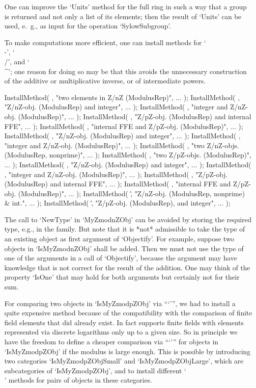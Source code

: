 One can improve the `Units' method for the full ring in such a way
that a group is returned and not only a list of its elements;
then the result of `Units' can be used, e.~g., as input for the operation
`SylowSubgroup'.

To make computations more efficient,
one can install methods for `\\-', `\\/', and `\\^';
one reason for doing so may be that this avoids the unnecessary construction
of the additive or multiplicative inverse, or of intermediate powers.

\begintt
InstallMethod( \-, "two elements in Z/nZ (ModulusRep)", ... );
InstallMethod( \-, "Z/nZ-obj. (ModulusRep) and integer", ... );
InstallMethod( \-, "integer and Z/nZ-obj. (ModulusRep)", ... );
InstallMethod( \-, "Z/pZ-obj. (ModulusRep) and internal FFE", ... );
InstallMethod( \-, "internal FFE and Z/pZ-obj. (ModulusRep)", ... );
InstallMethod( \*, "Z/nZ-obj. (ModulusRep) and integer", ... );
InstallMethod( \*, "integer and Z/nZ-obj. (ModulusRep)", ... );
InstallMethod( \/, "two Z/nZ-objs. (ModulusRep, nonprime)", ... );
InstallMethod( \/, "two Z/pZ-objs. (ModulusRep)", ... );
InstallMethod( \/, "Z/nZ-obj. (ModulusRep) and integer", ... );
InstallMethod( \/, "integer and Z/nZ-obj. (ModulusRep)", ... );
InstallMethod( \/, "Z/pZ-obj. (ModulusRep) and internal FFE", ... );
InstallMethod( \/, "internal FFE and Z/pZ-obj. (ModulusRep)", ... );
InstallMethod( \^, "Z/nZ-obj. (ModulusRep, nonprime) & int.", ... );
InstallMethod( \^, "Z/pZ-obj. (ModulusRep), and integer", ... );
\endtt

The call to `NewType' in `MyZmodnZObj' can be avoided by storing
the required type, e.g., in the family.
But note that it is *not* admissible to take the type of an existing
object as first argument of `Objectify'.
For example, suppose two objects in `IsMyZmodnZObj' shall be added.
Then we must not use the type of one of the arguments in a call of
`Objectify', because the argument may have knowledge that is not
correct for the result of the addition.
One may think of the property `IsOne' that may hold for both
arguments but certainly not for their sum.

For comparing two objects in `IsMyZmodpZObj' via ```\<''',
we had to install a quite expensive method because of the compatibility
with the comparison of finite field elements that did already exist.
In fact {\GAP} supports finite fields with elements represented via
discrete logarithms only up to a given size.
So in principle we have the freedom to define a cheaper comparison
via ```\<''' for objects in `IsMyZmodpZObj' if the modulus is large
enough.
This is possible by introducing two categories `IsMyZmodpZObjSmall'
and `IsMyZmodpZObjLarge', which are subcategories of `IsMyZmodpZObj',
and to install different `\\\<' methods for pairs of objects
in these categories.



